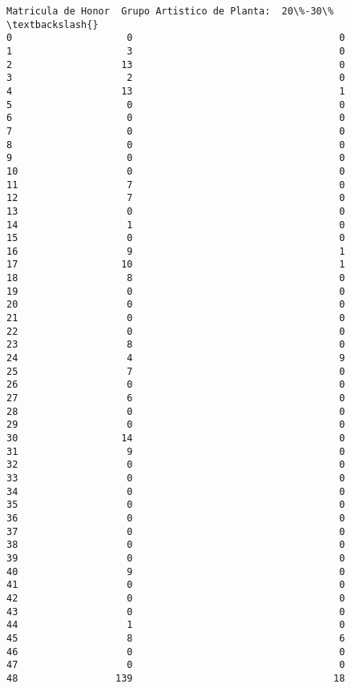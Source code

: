 \documentclass[11pt]{article}
\begin{document}
\begin{Verbatim}[commandchars=\\\{\}]
    Matricula de Honor  Grupo Artistico de Planta:  20\%-30\%  \textbackslash{}
0                    0                                    0   
1                    3                                    0   
2                   13                                    0   
3                    2                                    0   
4                   13                                    1   
5                    0                                    0   
6                    0                                    0   
7                    0                                    0   
8                    0                                    0   
9                    0                                    0   
10                   0                                    0   
11                   7                                    0   
12                   7                                    0   
13                   0                                    0   
14                   1                                    0   
15                   0                                    0   
16                   9                                    1   
17                  10                                    1   
18                   8                                    0   
19                   0                                    0   
20                   0                                    0   
21                   0                                    0   
22                   0                                    0   
23                   8                                    0   
24                   4                                    9   
25                   7                                    0   
26                   0                                    0   
27                   6                                    0   
28                   0                                    0   
29                   0                                    0   
30                  14                                    0   
31                   9                                    0   
32                   0                                    0   
33                   0                                    0   
34                   0                                    0   
35                   0                                    0   
36                   0                                    0   
37                   0                                    0   
38                   0                                    0   
39                   0                                    0   
40                   9                                    0   
41                   0                                    0   
42                   0                                    0   
43                   0                                    0   
44                   1                                    0   
45                   8                                    6   
46                   0                                    0   
47                   0                                    0   
48                 139                                   18   


\end{Verbatim}
\end{document}
